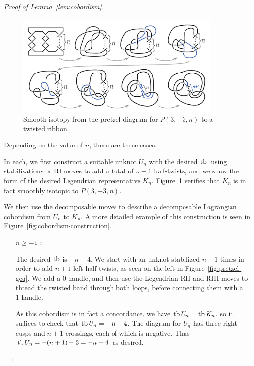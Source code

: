 \begin{proof}[Proof of Lemma~\ref{lem:cobordism}]

    \begin{figure}[ht]
        \centering
        \includegraphics[width=0.9\textwidth]{images/isotopy-presentable.pdf}
        \caption{Smooth isotopy from the pretzel diagram for $P(3, -3, n)$ to a twisted ribbon.}
        \label{fig:isotopy}
    \end{figure}

    Depending on the value of $n$, there are three cases.

    In each, we first construct a suitable unknot $U_n$ with the desired $\operatorname{tb}$, using stabilizations or RI moves to add a total of $n-1$ half-twists, and we show the form of the desired Legendrian representative $K_n$. Figure~\ref{fig:isotopy} verifies that $K_n$ is in fact smoothly isotopic to $P(3, -3, n)$.

    We then use the decomposable moves to describe a decomposable Lagrangian cobordism from $U_n$ to $K_n$. A more detailed example of this construction is seen in Figure~\ref{fig:cobordism-construction}.

\begin{itemize}

    \item[$n \geq -1$ :]

        The desired $\operatorname{tb}$ is $-n-4$.
        We start with an unknot stabilized $n+1$ times in order to add $n+1$ left half-twists, as seen on the left in Figure~\ref{fig:pretzel-geq}.
        We add a 0-handle, and then use the Legendrian RII and RIII moves to thread the twisted band through both loops, before connecting them with a 1-handle.


        As this cobordism is in fact a concordance, we have $\operatorname{tb} U_n = \operatorname{tb} K_n$, so it suffices to check that $\operatorname{tb} U_n = -n-4$. The diagram for $U_n$ has three right cusps and $n+1$ crossings, each of which is negative. Thus $\operatorname{tb} U_n = -(n+1) - 3 = -n-4$ as desired.


\end{itemize}
\end{proof}
